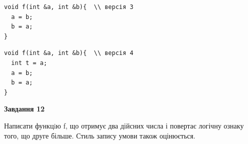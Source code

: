 \documentclass[12pt, ukrainian]{article}
\begin{document}
{\begin {large}
\begin{minipage}[t]{11.0cm}
\vspace{-8mm}\begin{verbatim}
void f(int &a, int &b){  \\ версія 3
  a = b;
  b = a;
}
\end{verbatim}

\vspace{-8mm}\begin{verbatim}
void f(int &a, int &b){  \\ версія 4
  int t = a;
  a = b;
  b = a;
}
\end{verbatim}



\begin{center}
\textbf{Завдання 12}
\end{center}

Написати функцiю f, що отримує два дійсних числа і повертає логічну ознаку того, що друге більше. Стиль запису умови також оцінюється.\par

\end{minipage}

\end {large}}
\newpage
\end{document}
